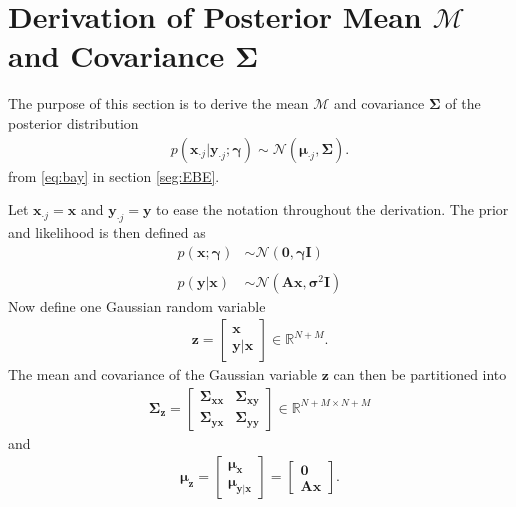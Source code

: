 \section{Derivation of Posterior Mean $\mathcal{M}$ and Covariance $\boldsymbol{\Sigma}$}\label{app_sec:mean_cov}
The purpose of this section is to derive the mean $\mathcal{M}$ and covariance $\boldsymbol{\Sigma}$ of the posterior distribution
\begin{align*}
p\left( \mathbf{x}_{\cdot j} \vert \mathbf{y}_{\cdot j} ; \boldsymbol{\gamma} \right) \sim \mathcal{N}(\boldsymbol{\mu}_{\cdot j} , \boldsymbol{\Sigma}).
\end{align*}
from \eqref{eq:bay} in section \ref{seg:EBE}. 

Let $\mathbf{x}_{\cdot j} = \mathbf{x}$ and $\mathbf{y}_{\cdot j} = \mathbf{y}$ to ease the notation throughout the derivation. The prior and likelihood is then defined as
\begin{align*}
p(\mathbf{x} ; \boldsymbol{\gamma}) &\sim \mathcal{N}(\mathbf{0}, \boldsymbol{\gamma} \mathbf{I} ) \\
& \\
p(\mathbf{y} \vert \mathbf{x}) &\sim \mathcal{N}(\mathbf{A}\mathbf{x}, \boldsymbol{\sigma}^2 \mathbf{I})
\end{align*}
Now define one Gaussian random variable  
\begin{align*}
\mathbf{z} = \begin{bmatrix}
\mathbf{x} \\ 
\mathbf{y}\vert \mathbf{x} 
\end{bmatrix} \in \mathbb{R}^{N + M}.	
\end{align*}  
The mean and covariance of the Gaussian variable $\mathbf{z}$ can then be partitioned into 
\begin{align*}
\boldsymbol{\Sigma}_{\mathbf{z}} = 
\begin{bmatrix}
\boldsymbol{\Sigma}_{\mathbf{x}\mathbf{x}} & \boldsymbol{\Sigma}_{\mathbf{x}\mathbf{y}} \\ 
\boldsymbol{\Sigma}_{\mathbf{y}\mathbf{x}} & \boldsymbol{\Sigma}_{\mathbf{y}\mathbf{y}}
\end{bmatrix} 
\in \mathbb{R}^{N+M \times N+M}
\end{align*}
and
\begin{align*}
\boldsymbol{\mu}_{\mathbf{z}} = 
\begin{bmatrix}
\boldsymbol{\mu}_{\mathbf{x}} \\ 
\boldsymbol{\mu}_{\mathbf{y} \vert \mathbf{x}}
\end{bmatrix} 
= 
\begin{bmatrix}
\mathbf{0}  \\ 
\mathbf{A} \mathbf{x}
\end{bmatrix}.
\end{align*}

